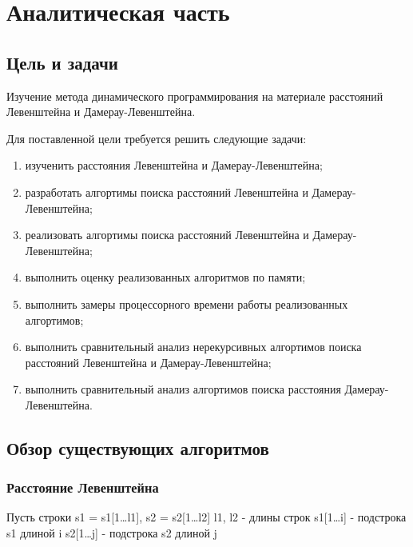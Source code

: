 \section{Аналитическая часть}

\subsection{Цель и задачи}

Изучение метода динамического программирования на материале расстояний Левенштейна и Дамерау-Левенштейна.

Для поставленной цели требуется решить следующие задачи:

\begin{enumerate}[leftmargin=1.6\parindent]
	\item изученить расстояния Левенштейна и Дамерау-Левенштейна;
	\item разработать алгортимы поиска расстояний Левенштейна и Дамерау-Левенштейна;
	\item реализовать алгортимы поиска расстояний Левенштейна и Дамерау-Левенштейна;
	\item выполнить оценку реализованных алгоритмов по памяти;
	\item выполнить замеры процессорного времени работы реализованных алгортимов;
	\item выполнить сравнительный анализ нерекурсивных алгортимов поиска расстояний Левенштейна и Дамерау-Левенштейна;
	\item выполнить сравнительный анализ алгортимов поиска расстояния \newline Дамерау-Левенштейна.
\end{enumerate}
\pagebreak
\subsection{Обзор существующих алгоритмов}

\subsubsection{Расстояние Левенштейна}
Пусть строки s1 = s1[1\dots l1], s2 = s2[1\dots l2]\newline
l1, l2 - длины строк\newline
s1[1\dots i] - подстрока s1 длиной i\newline
s2[1\dots j] - подстрока s2 длиной j

